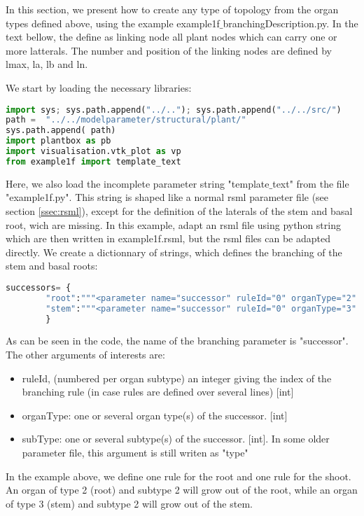 In this section, we present how to create any type of topology from the organ types defined above, using the example example1f$\_$branchingDescription.py.
In the text bellow, the define as linking node all plant nodes which can carry one or more latterals. The number and position of the linking nodes are defined by lmax, la, lb and ln.

% 
We start by loading the necessary libraries:
\begin{lstlisting}[language=Python]
import sys; sys.path.append("../.."); sys.path.append("../../src/")
path =  "../../modelparameter/structural/plant/"
sys.path.append( path)
import plantbox as pb
import visualisation.vtk_plot as vp
from example1f import template_text
\end{lstlisting}

Here, we also load the incomplete parameter string "template$\_$text" from the file "example1f.py". This string is shaped like a normal rsml parameter file (see section \ref{ssec:rsml}), except for the definition of the laterals of the stem and basal root, wich are missing. In this example, adapt an rsml file using python string which are then written in example1f.rsml, but the rsml files can be adapted directly.
We create a dictionnary of strings, which defines the branching of the stem and basal roots:
\begin{lstlisting}[language=Python]
successors= {
        "root":"""<parameter name="successor" ruleId="0" organType="2" subType="2" probability="1"/>""",
        "stem":"""<parameter name="successor" ruleId="0" organType="3" subType="2" probability="1"/>"""
        }
\end{lstlisting}
As can be seen in the code, the name of the branching parameter is "successor". 
The other arguments of interests are:
\begin{itemize}
 \item ruleId, (numbered per organ subtype) an integer giving the index of the branching rule (in case rules are defined over several lines) [int]
 \item organType: one or several organ type(s) of the successor. [int]
 \item subType: one or several subtype(s) of the successor. [int]. In some older parameter file, this argument is still writen as "type"
\end{itemize}
In the example above, we define one rule for the root and one rule for the shoot. An organ of type 2 (root) and subtype 2 will grow out of the root, while an organ of type 3 (stem) and subtype 2 will grow out of the stem.


